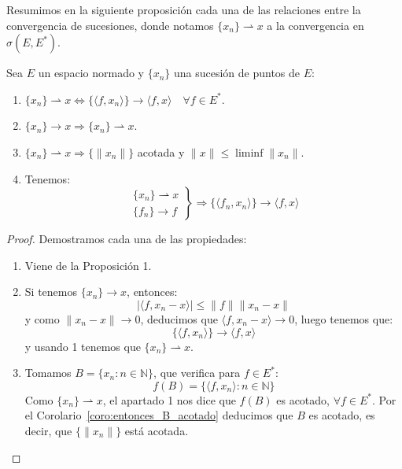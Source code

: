 \noindent
Resumimos en la siguiente proposición cada una de las relaciones entre la convergencia de sucesiones, donde notamos $\{x_n\} \rightharpoonup x$ a la convergencia en $\sigma(E,E^\ast)$.
\begin{prop}
    Sea $E$ un espacio normado y $\{x_n\}$ una sucesión de puntos de $E$:
    \begin{enumerate}
        \item $\{x_n\} \rightharpoonup x \Longleftrightarrow \{\langle f,x_n \rangle \}\to \langle f,x \rangle \quad \forall f\in E^\ast$.
        \item $\{x_n\}\to x \Longrightarrow \{x_n\} \rightharpoonup x$.
        \item $\{x_n\}\rightharpoonup x \Longrightarrow \{\|x_n\|\}$ acotada y $\|x\|\leq \liminf \|x_n\|$.
        \item Tenemos:
            \begin{equation*}
                \left.\begin{array}{r}
                    \{x_n\}\rightharpoonup x \\
                    \{f_n\} \to f
                \end{array}\right\} \Longrightarrow \{\langle f_n,x_n \rangle \}\to \langle f,x \rangle 
            \end{equation*}
    \end{enumerate}
    \begin{proof}
        Demostramos cada una de las propiedades:
        \begin{enumerate}
            \item Viene de la Proposición 1.
            \item Si tenemos $\{x_n\} \to x$, entonces:
                \begin{equation*}
                    |\langle f,x_n-x \rangle | \leq \|f\|\|x_n-x\| 
                \end{equation*}
                y como $\|x_n-x\| \to 0$, deducimos que $\langle f,x_n-x \rangle \to 0 $, luego tenemos que:
                \begin{equation*}
                    \{\langle f,x_n \rangle \}\to \langle f,x \rangle 
                \end{equation*}
                y usando 1 tenemos que $\{x_n\}\rightharpoonup x$.
            \item Tomamos $B = \{x_n : n\in \mathbb{N}\}$, que verifica para $f\in E^\ast$:
                \begin{equation*}
                    f(B) = \{\langle f,x_n \rangle : n\in \mathbb{N}\}
                \end{equation*}
                Como $\{x_n\}\rightharpoonup x$, el apartado 1 nos dice que $f(B)$ es acotado, $\forall f\in E^\ast$. Por el Corolario~\ref{coro:entonces_B_acotado} deducimos que $B$ es acotado, es decir, que $\{\|x_n\|\}$ está acotada.


\end{enumerate}
\end{proof}
\end{prop}
